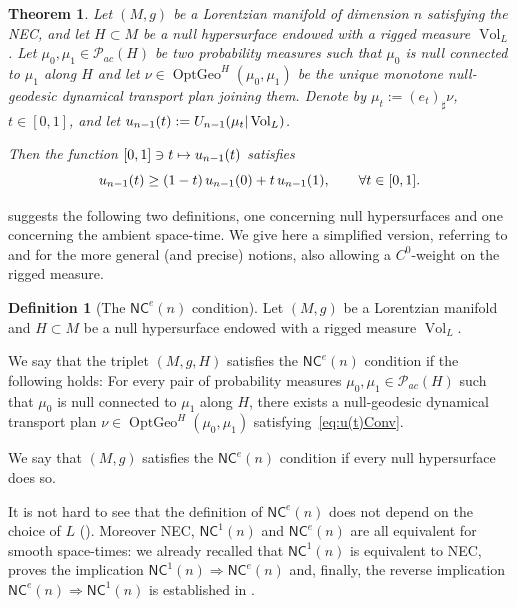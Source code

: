 \documentclass[12pt,a4paper]{amsart}
\theoremstyle{plain}
\newtheorem{theorem}[lemma]{Theorem}
\theoremstyle{definition}
\newtheorem{definition}[lemma]{Definition}
\numberwithin{equation}{section}
\DeclareMathOperator{\OptGeo}{OptGeo}
\DeclareMathOperator{\vol}{Vol}
\newcommand{\NC}{\mathsf{NC}}
\newcommand{\Prob}{\mathcal P}
\begin{document}
\begin{theorem}
  \label{T:convexity-of-entropy-null-Intro}
  Let $(M,g)$ be a Lorentzian manifold of
  dimension $n$ satisfying the NEC, and let $H\subset M$ be a null hypersurface endowed with a rigged measure $\vol_L$.
  Let $\mu_0,\mu_1\in \Prob_{ac}(H)$ be two probability measures
  such that $\mu_0$ is null connected to $\mu_1$ along $H$
  and let $\nu\in\OptGeo^H(\mu_0,\mu_1)$ be the unique monotone null-geodesic
  dynamical transport plan joining them.
  Denote by $\mu_t:=(e_t)_{\sharp}\nu$, $t\in [0,1]$, and let  
${\rm u}_{n-1}(t):= {\rm  U}_{n-1}(\mu_t|\vol_L)$. 


Then  the function $[0,1]\ni t \mapsto {\rm u}_{n-1}(t)$ satisfies 
\begin{equation}\label{eq:u(t)Conv}
{\rm u}_{n-1}(t) \geq (1-t)\, {\rm u}_{n-1}(0)+t\, {\rm u}_{n-1}(1), \qquad \forall t\in [0,1].
\end{equation}
\end{theorem}




 suggests the following two definitions, one
concerning null hypersurfaces and one concerning the ambient space-time. We give here a simplified version, referring to  and  for the more general (and precise) notions, also allowing a $C^0$-weight on the rigged measure.


\begin{definition}[The $\NC^e(n)$ condition]\label{D:entropynullCD-intro}
  Let $(M,g)$ be a Lorentzian manifold
  and $H\subset M$ be a null hypersurface endowed with a rigged measure $\vol_L$. 

  We say that the triplet $(M,g,H)$ satisfies the
  $\NC^e(n)$ condition if the following holds:
  For every pair of probability measures $\mu_0,\mu_1\in \Prob_{ac}(H)$ 
  such that $\mu_0$ is null connected to $\mu_1$ along $H$,
  there exists  a null-geodesic
  dynamical transport plan $\nu\in\OptGeo^H(\mu_0,\mu_1)$ satisfying~\eqref{eq:u(t)Conv}.

  We say that $(M,g)$ satisfies the  $\NC^e(n)$ condition if every null hypersurface does so.
\end{definition}

It is not hard to see that the definition of $\NC^e(n)$ does not depend on the choice of $L$ (). Moreover NEC, $\NC^1(n)$ and $\NC^e(n)$ are all equivalent for smooth space-times: we already recalled that $\NC^1(n)$ is equivalent to NEC,   proves the implication $\NC^1(n)\Rightarrow \NC^e(n)$ and, finally, the reverse implication $\NC^e(n)\Rightarrow \NC^1(n)$ is established in .
\end{document}
